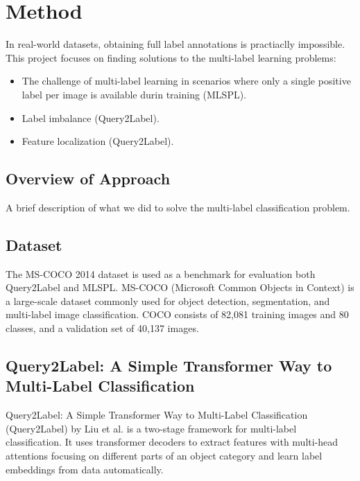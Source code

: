 \documentclass[lettersize,journal]{IEEEtran}
\begin{document}

\section{Method}

In real-world datasets, obtaining full label annotations is practiaclly impossible.
This project focuses on finding solutions to the multi-label learning problems:
\begin{itemize} 
    \item  The challenge of multi-label learning in scenarios where only a single positive label per image is available durin training (MLSPL).
    \item Label imbalance (Query2Label).
    \item Feature localization (Query2Label).
\end{itemize}

\subsection{Overview of Approach}
A brief description of what we did to solve the multi-label classification problem. 

\subsection{Dataset}
The MS-COCO 2014 \cite{coco14} dataset is used as a benchmark for evaluation both Query2Label and MLSPL. MS-COCO (Microsoft Common Objects in Context) is a large-scale dataset commonly used for object detection, segmentation, and multi-label image classification. COCO consists of 82,081 training images and 80 classes, and a validation set of 40,137 images.

\subsection{Query2Label: A Simple Transformer Way to Multi-Label Classification}
Query2Label: A Simple Transformer Way to Multi-Label Classification (Query2Label) by Liu et al. \cite{Query2Label} is a two-stage framework for multi-label classification. It uses transformer decoders to extract features with multi-head attentions focusing on different parts of an object category and learn label embeddings from data automatically.
\end{document}
